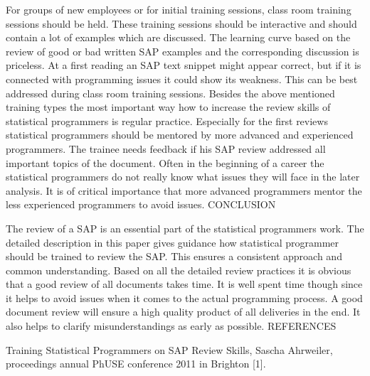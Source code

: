 For groups of new employees or for initial training sessions, class room training sessions should be held. These training sessions should be interactive and should contain a lot of examples which are discussed. The learning curve based on the review of good or bad written SAP examples and the corresponding discussion is priceless. At a first reading an SAP text snippet might appear correct, but if it is connected with programming issues it could show its weakness. This can be best addressed during class room training sessions.
Besides the above mentioned training types the most important way how to increase the review skills of statistical programmers is regular practice. Especially for the first reviews statistical programmers should be mentored by more advanced and experienced programmers. The trainee needs feedback if his SAP review addressed all important topics of the document. Often in the beginning of a career the statistical programmers do not really know what issues they will face in the later analysis. It is of critical importance that more advanced programmers mentor the less experienced programmers to avoid issues.
CONCLUSION

The review of a SAP is an essential part of the statistical programmers work. The detailed description in this paper gives guidance how statistical programmer should be trained to review the SAP. This ensures a consistent approach and common understanding. Based on all the detailed review practices it is obvious that a good review of all documents takes time. It is well spent time though since it helps to avoid issues when it comes to the actual programming process. A good document review will ensure a high quality product of all deliveries in the end. It also helps to clarify misunderstandings as early as possible.
REFERENCES

Training Statistical Programmers on SAP Review Skills, Sascha Ahrweiler, proceedings annual PhUSE conference 2011 in Brighton [1].
